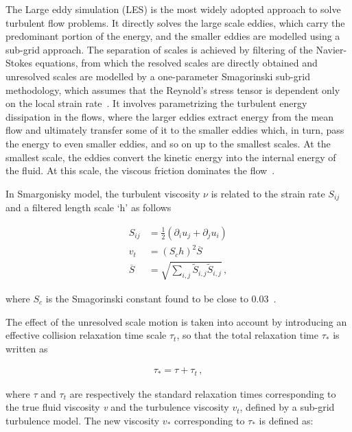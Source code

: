 The Large eddy simulation (LES) is the most widely adopted approach to solve 
turbulent flow problems. It directly solves the large scale eddies, which carry 
the predominant portion of the energy, and the smaller eddies are modelled 
using a sub-grid approach. The separation of scales is achieved by filtering of 
the Navier-Stokes equations, from which the resolved scales are directly 
obtained and unresolved scales are modelled by a one-parameter Smagorinski 
sub-grid methodology, which assumes that the Reynold's stress tensor is 
dependent only on the local strain rate~\citep{Smagorinsky1963}. It involves 
parametrizing the turbulent energy dissipation in the flows, where the larger 
eddies extract energy from the mean flow and ultimately transfer some of it to 
the smaller eddies which, in turn, pass the energy to even smaller eddies, and 
so on up to the smallest scales. At the smallest scale, the eddies convert the 
kinetic energy into the internal energy of the fluid. At this scale, the 
viscous friction dominates the flow~\citep{Frisch1995}.

In Smargonisky model, the turbulent viscosity $\nu$ is related to the strain 
rate $S_{ij}$ and a filtered length scale `h' as follows

\begin{align}
S_{ij} & = \frac{1}{2}(\partial_i u_j + \partial_j u_i) \\
\mathit{v}_{\mathit{t}} & = (\mathit{S}_{c}\mathit{h})^{2}\overline{S} \\
\overline{S} & =  
\sqrt{\sum\limits_{\mathit{i,j}}{\tilde{S}_{\mathit{i,j}}\tilde{S}_{\mathit{i,j}}}}\,,
\end{align}

\noindent where $\mathit{S}_{c}$ is the Smagorinski constant found to be close 
to 0.03~\citep{yu2005}. 

The effect of the unresolved scale motion is taken into account by introducing 
an effective collision relaxation time scale $\tau_{t}$, so that the total 
relaxation time $\tau_{*}$ is written as

\begin{align}
\tau_{*}=\tau + \tau_{t}\,,
\end{align} 

\noindent where $\tau$ and $\tau_{t}$ are respectively the standard relaxation 
times 
corresponding to the true fluid viscosity \textit{v} and the turbulence 
viscosity $\mathit{v}_{\mathit{t}}$, defined by a sub-grid turbulence model. 
The new viscosity $\mathit{v}_{*}$ corresponding to $\tau_{*}$ is defined as:

